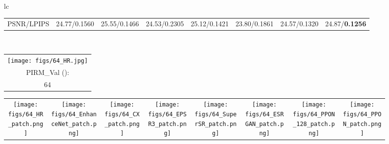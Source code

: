 \documentclass[preprint]{elsarticle}
\begin{document}
\begin{figure*}[htpb]
{\begin{tabular}{lc}
\begin{adjustbox}{valign=t}
\begin{tabular}{cccccccc}
					PSNR/LPIPS & \hspace{-3mm} 24.77/0.1560 & \hspace{-3mm} 25.55/0.1466 & \hspace{-3mm} 24.53/0.2305 &
					25.12/0.1421 & \hspace{-3mm} 23.80/0.1861 & \hspace{-3mm} 24.57/0.1320 & \hspace{-3mm} 24.87/\textbf{0.1256} \\
				\end{tabular}
			\end{adjustbox}
			\\
			\begin{adjustbox}{valign=t}
				\scriptsize
				\begin{tabular}{c}
					\texttt{[image: figs/64\_HR.jpg]} \\
					PIRM\_Val (): \\
					64 \\
				\end{tabular}
			\end{adjustbox}
			\hspace{-3mm}
			\begin{adjustbox}{valign=t}
				\scriptsize
				\begin{tabular}{cccccccc}
					\texttt{[image: figs/64\_HR\_patch.png]} &
					\hspace{-3mm}
					\texttt{[image: figs/64\_EnhanceNet\_patch.png]} &
					\hspace{-3mm}
					\texttt{[image: figs/64\_CX\_patch.png]} &
					\hspace{-3mm}
					\texttt{[image: figs/64\_EPSR3\_patch.png]} &
					\hspace{-3mm}					
					\texttt{[image: figs/64\_SuperSR\_patch.png]} &
					\hspace{-3mm}
					\texttt{[image: figs/64\_ESRGAN\_patch.png]} &
					\hspace{-3mm}
					\texttt{[image: figs/64\_PPON\_128\_patch.png]} &
					\hspace{-3mm}
					\texttt{[image: figs/64\_PPON\_patch.png]} \\
					

\end{tabular}
\end{adjustbox}
\end{tabular}}
\end{figure*}
\end{document}
